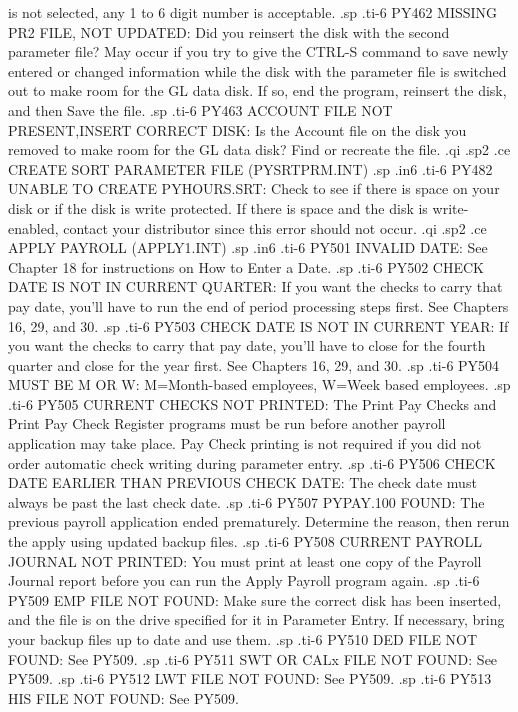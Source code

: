 is not selected, any 1 to 6 digit number is acceptable.
.sp
.ti-6
PY462 MISSING PR2 FILE, NOT UPDATED: Did you reinsert the disk with the
second parameter file?	May occur if you try to give the CTRL-S command
to save newly entered or changed information while the disk with the
parameter file is switched out to make room for the GL data disk.  If
so, end the program, reinsert the disk, and then Save the file.
.sp
.ti-6
PY463 ACCOUNT FILE NOT PRESENT,INSERT CORRECT DISK: Is the Account file
on the disk you removed to make room for the GL data disk?  Find or
recreate the file.
.qi
.sp2
.ce
CREATE SORT PARAMETER FILE (PYSRTPRM.INT)
.sp
.in6
.ti-6
PY482 UNABLE TO CREATE PYHOURS.SRT:  Check to see if there is space on
your disk or if the disk is write protected.  If there is space and
the disk is write-enabled, contact your distributor since this error
should not occur.
.qi
.sp2
.ce
APPLY PAYROLL (APPLY1.INT)
.sp
.in6
.ti-6
PY501 INVALID DATE: See Chapter 18 for instructions on How to Enter
a Date.
.sp
.ti-6
PY502 CHECK DATE IS NOT IN CURRENT QUARTER: If you want the checks to
carry that pay date, you'll have to run the end of period processing
steps first.  See Chapters 16, 29, and 30.
.sp
.ti-6
PY503 CHECK DATE IS NOT IN CURRENT YEAR: If you want the checks to carry
that pay date, you'll have to close for the fourth quarter and close
for the year first.  See Chapters 16, 29, and 30.
.sp
.ti-6
PY504 MUST BE M OR W: M=Month-based employees, W=Week based employees.
.sp
.ti-6
PY505 CURRENT CHECKS NOT PRINTED: The Print Pay Checks and Print Pay
Check Register programs must be run before another payroll application
may take place.  Pay Check printing is not required if you did not order
automatic check writing during parameter entry.
.sp
.ti-6
PY506 CHECK DATE EARLIER THAN PREVIOUS CHECK DATE:  The check date must
always be past the last check date.
.sp
.ti-6
PY507 PYPAY.100 FOUND: The previous payroll application ended prematurely.
Determine the reason, then rerun the apply using updated backup files.
.sp
.ti-6
PY508 CURRENT PAYROLL JOURNAL NOT PRINTED: You must print at least one
copy of the Payroll Journal report before you can run the Apply Payroll
program again.
.sp
.ti-6
PY509 EMP FILE NOT FOUND: Make sure the correct disk has been inserted,
and the file is on the drive specified for it in Parameter Entry.
If necessary, bring your backup files up to date and use them.
.sp
.ti-6
PY510 DED FILE NOT FOUND: See PY509.
.sp
.ti-6
PY511 SWT OR CALx FILE NOT FOUND: See PY509.
.sp
.ti-6
PY512 LWT FILE NOT FOUND: See PY509.
.sp
.ti-6
PY513 HIS FILE NOT FOUND: See PY509.
